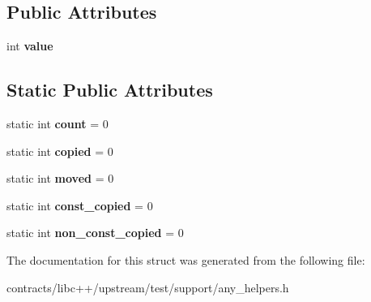\subsection*{Public Attributes}
\begin{DoxyCompactItemize}
\item 
\mbox{\label{structlarge__type_a5f8672f6dc275a71fb0e53eb03245704}} 
int {\bfseries value}
\end{DoxyCompactItemize}
\subsection*{Static Public Attributes}
\begin{DoxyCompactItemize}
\item 
\mbox{\label{structlarge__type_a61e92064f8bbf606dfbcc99c313f6102}} 
static int {\bfseries count} = 0
\item 
\mbox{\label{structlarge__type_a15dd897483bde3d9906da14bf9f3dc4a}} 
static int {\bfseries copied} = 0
\item 
\mbox{\label{structlarge__type_a0cd7ca6bb23d3030a438e83954581fd1}} 
static int {\bfseries moved} = 0
\item 
\mbox{\label{structlarge__type_aba4f4edd63ea24e4dca1f544bfa35ad7}} 
static int {\bfseries const\+\_\+copied} = 0
\item 
\mbox{\label{structlarge__type_aab60af1ebe7c403b996ba911af538995}} 
static int {\bfseries non\+\_\+const\+\_\+copied} = 0
\end{DoxyCompactItemize}


The documentation for this struct was generated from the following file\+:\begin{DoxyCompactItemize}
\item 
contracts/libc++/upstream/test/support/any\+\_\+helpers.\+h\end{DoxyCompactItemize}
